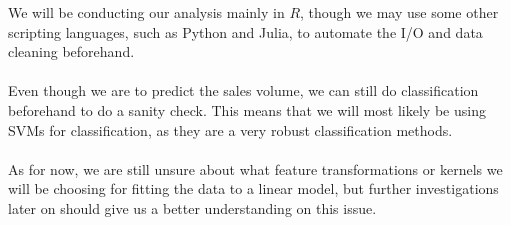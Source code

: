 \documentclass[psamsfonts]{amsart}
\begin{document}
We will be conducting our analysis mainly in $R$, though we may use some other scripting languages, such as Python and Julia, to automate the I/O and data cleaning beforehand.\\
\\
Even though we are to predict the sales volume, we can still do classification beforehand to do a sanity check. This means that we will most likely be using SVMs for classification, as they are a very robust classification methods.\\
\\
As for now, we are still unsure about what feature transformations or kernels we will be choosing for fitting the data to a linear model, but further investigations later on should give us a better understanding on this issue.
\end{document}
